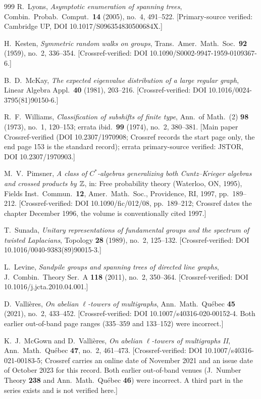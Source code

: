 \begin{thebibliography}{999}
 R.~Lyons, \emph{Asymptotic enumeration of spanning trees}, Combin.\ Probab.\ Comput.\ \textbf{14} (2005), no.~4, 491--522. [Primary-source verified: Cambridge UP, DOI 10.1017/S096354830500684X.]

 H.~Kesten, \emph{Symmetric random walks on groups}, Trans.\ Amer.\ Math.\ Soc.\ \textbf{92} (1959), no.~2, 336--354. [Crossref-verified: DOI 10.1090/S0002-9947-1959-0109367-6.]

 B.~D.~McKay, \emph{The expected eigenvalue distribution of a large regular graph}, Linear Algebra Appl.\ \textbf{40} (1981), 203--216. [Crossref-verified: DOI 10.1016/0024-3795(81)90150-6.]

 R.~F.~Williams, \emph{Classification of subshifts of finite type}, Ann.\ of Math.\ (2) \textbf{98} (1973), no.~1, 120--153; errata ibid.\ \textbf{99} (1974), no.~2, 380--381. [Main paper Crossref-verified (DOI 10.2307/1970908; Crossref records the start page only, the end page 153 is the standard record); errata primary-source verified: JSTOR, DOI 10.2307/1970903.]

 M.~V.~Pimsner, \emph{A class of $C^*$-algebras generalizing both Cuntz--Krieger algebras and crossed products by $\mathbb{Z}$}, in: Free probability theory (Waterloo, ON, 1995), Fields Inst.\ Commun.\ \textbf{12}, Amer.\ Math.\ Soc., Providence, RI, 1997, pp.~189--212. [Crossref-verified: DOI 10.1090/fic/012/08, pp.~189--212; Crossref dates the chapter December 1996, the volume is conventionally cited 1997.]

 T.~Sunada, \emph{Unitary representations of fundamental groups and the spectrum of twisted Laplacians}, Topology \textbf{28} (1989), no.~2, 125--132. [Crossref-verified: DOI 10.1016/0040-9383(89)90015-3.]

 L.~Levine, \emph{Sandpile groups and spanning trees of directed line graphs}, J.\ Combin.\ Theory Ser.\ A \textbf{118} (2011), no.~2, 350--364. [Crossref-verified: DOI 10.1016/j.jcta.2010.04.001.]

 D.~Vallières, \emph{On abelian $\ell$-towers of multigraphs}, Ann.\ Math.\ Qu\'ebec \textbf{45} (2021), no.~2, 433--452. [Crossref-verified: DOI 10.1007/s40316-020-00152-4. Both earlier out-of-band page ranges (335--359 and 133--152) were incorrect.]

 K.~J.~McGown and D.~Vallières, \emph{On abelian $\ell$-towers of multigraphs II}, Ann.\ Math.\ Qu\'ebec \textbf{47}, no.~2, 461--473. [Crossref-verified: DOI 10.1007/s40316-021-00183-5; Crossref carries an online date of November 2021 and an issue date of October 2023 for this record. Both earlier out-of-band venues (J.\ Number Theory \textbf{238} and Ann.\ Math.\ Qu\'ebec \textbf{46}) were incorrect. A third part in the series exists and is not verified here.]


\end{thebibliography}
